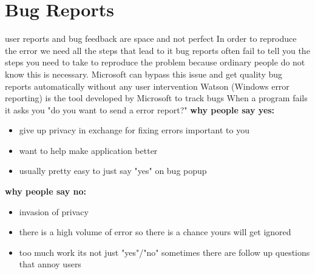 \documentclass[twoside]{article}
\begin{document}
\section{Bug Reports}
user reports and bug feedback are space and not perfect 
\newline
In order to reproduce the error we need all the steps that lead to it
\newline
bug reports often fail to tell you the steps you need to take to reproduce the problem because ordinary people do not know this is necessary. 
\newline
Microsoft can bypass this issue and get quality bug reports automatically without any user intervention
\newline
Watson (Windows error reporting) is the tool developed by Microsoft to track bugs
\newline
When a program fails it asks you "do you want to send a error report?"
\newline
\textbf{why people say yes:}
\begin{itemize}
    \item give up privacy in exchange for fixing errors important to you
    \item want to help make application better
    \item usually pretty easy to just say "yes" on bug popup
\end{itemize}
\textbf{why people say no:}
\begin{itemize}
    \item invasion of privacy
    \item there is a high volume of error so there is a chance yours will get ignored
    \item too much work its not just "yes"/"no" sometimes there are follow up questions that annoy users
\end{itemize}
\end{document}
